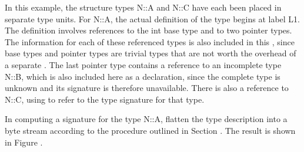 In this example, the structure types N::A and N::C have each
been placed in separate 
type units.  For N::A, the actual
definition of the type begins at label L1. The definition
involves references to the int base type and to two pointer
types. The information for each of these referenced types is
also included in this , 
since base types and pointer
types are trivial types that are not worth the overhead of a
separate . 
The last pointer type contains a reference
to an incomplete type N::B, which is also included here as
a declaration, since the complete type is unknown and its
signature is therefore unavailable. There is also a reference
to N::C, using 
 to 
refer to the type signature
for that type.

In computing a signature for the type N::A, flatten the type
description into a byte stream according to the procedure
outlined in 
Section .
The result is shown in 
Figure .

